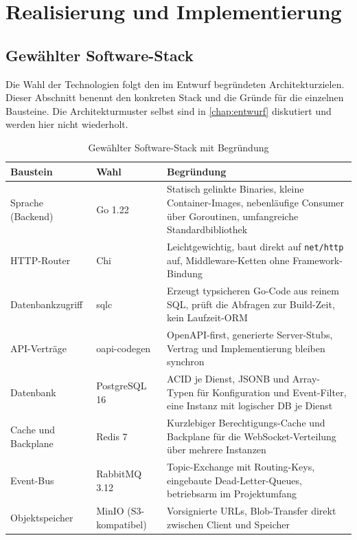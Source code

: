 \chapter{Realisierung und Implementierung}
\label{chap:realisierung}

\section{Gewählter Software-Stack}
\label{sec:software-stack}

Die Wahl der Technologien folgt den im Entwurf begründeten Architekturzielen. Dieser Abschnitt benennt den konkreten Stack und die Gründe für die einzelnen Bausteine. Die Architekturmuster selbst sind in \vref{chap:entwurf} diskutiert und werden hier nicht wiederholt.

\begin{table}[ht]
  \centering
  \caption{Gewählter Software-Stack mit Begründung}
  \label{tab:software-stack}
  \begin{tabularx}{\linewidth}{@{}l>{\raggedright\arraybackslash}p{3.4cm}X@{}}
    \toprule
    \textbf{Baustein} & \textbf{Wahl} & \textbf{Begründung} \\
    \midrule
    Sprache (Backend)   & Go 1.22            & Statisch gelinkte Binaries, kleine Container-Images, nebenläufige Consumer über Goroutinen, umfangreiche Standardbibliothek \\
    HTTP-Router         & Chi                & Leichtgewichtig, baut direkt auf \texttt{net/http} auf, Middleware-Ketten ohne Framework-Bindung \\
    Datenbankzugriff    & sqlc               & Erzeugt typsicheren Go-Code aus reinem SQL, prüft die Abfragen zur Build-Zeit, kein Laufzeit-ORM \\
    API-Verträge        & oapi-codegen       & OpenAPI-first, generierte Server-Stubs, Vertrag und Implementierung bleiben synchron \\
    Datenbank           & PostgreSQL 16      & ACID je Dienst, JSONB und Array-Typen für Konfiguration und Event-Filter, eine Instanz mit logischer DB je Dienst \\
    Cache und Backplane & Redis 7            & Kurzlebiger Berechtigungs-Cache und Backplane für die WebSocket-Verteilung über mehrere Instanzen \\
    Event-Bus           & RabbitMQ 3.12      & Topic-Exchange mit Routing-Keys, eingebaute Dead-Letter-Queues, betriebsarm im Projektumfang \\
    Objektspeicher      & MinIO (S3-kompatibel) & Vorsignierte URLs, Blob-Transfer direkt zwischen Client und Speicher \\

\end{tabularx}
\end{table}
